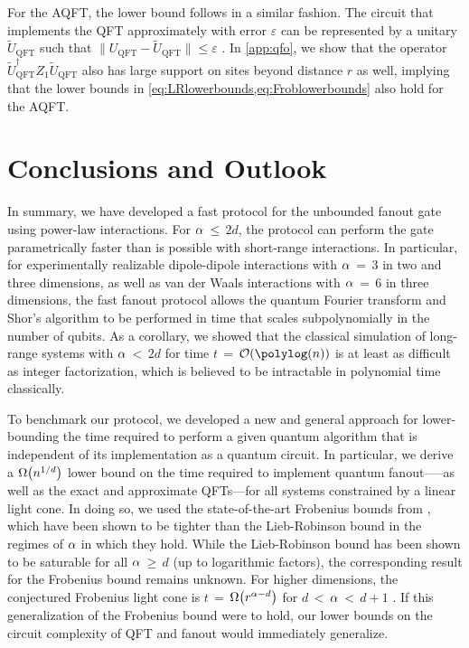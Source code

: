 For the AQFT, the lower bound follows in a similar fashion.
The circuit that implements the QFT approximately with error $\varepsilon$ can be represented by a unitary $\tilde{U}_\mathrm{QFT}$ such that $\|U_\mathrm{QFT}-\tilde {U}_\mathrm{QFT}\|\leq \varepsilon$ \cite{Cleve2000}.
In \cref{app:qfo}, we show that the operator $\tilde {U}_\mathrm{QFT}^\dag Z_1 \tilde {U}_\mathrm{QFT}$ also has large support on sites beyond distance $r$ as well, implying that the lower bounds in \cref{eq:LRlowerbounds,eq:Froblowerbounds} also hold for the AQFT.

\section{Conclusions and Outlook}
In summary, we have developed a fast protocol for the unbounded fanout gate using power-law interactions.
For $\alpha$\,$\le$\,$2d$, the protocol can perform the gate parametrically faster than is possible with short-range interactions.
In particular, for experimentally realizable dipole-dipole interactions with $\alpha$\,$=$\,$3$ in two and three dimensions, as well as van der Waals interactions with $\alpha$\,$=$\,$6$ in three dimensions, the fast fanout protocol allows the quantum Fourier transform and Shor's algorithm to be performed in time that scales subpolynomially in the number of qubits.
As a corollary, we showed that the classical simulation of long-range systems with $\alpha$\,$<$\,$2d$ for time $t$\,$=$\,$\O{\polylog(n)}$ is at least as difficult as integer factorization, which is believed to be intractable in polynomial time classically.

To benchmark our protocol, we developed a new and general approach for lower-bounding the time required to perform a given quantum algorithm that is independent of its implementation as a quantum circuit.
In particular, we derive a $\W{n^{1/d}}$ lower bound on the time required to implement quantum fanout—--as well as the exact and approximate QFTs---for all systems constrained by a linear light cone.
In doing so, we used the state-of-the-art Frobenius bounds from \cite{Tran2020hierarchylinearlightcones,Kuwahara2021,Chen2021Frobenius}, which have been shown to be tighter than the Lieb-Robinson bound in the regimes of $\alpha$ in which they hold.
While the Lieb-Robinson bound has been shown to be saturable for all $\alpha$\,$\ge$\,$d$ (up to logarithmic factors), the corresponding result for the Frobenius bound remains unknown.
For higher dimensions, the conjectured Frobenius light cone is $t$\,$=$\,$\W{r^{\alpha-d}}$ for $d$\,$<$\,$\alpha$\,$<$\,$d+1$ \cite{Chen2021Frobenius}.
If this generalization of the Frobenius bound were to hold, our lower bounds on the circuit complexity of QFT and fanout would immediately generalize.

